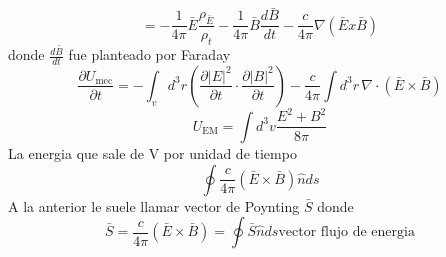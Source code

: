\documentclass{article}
\begin{document}
		\begin{equation*}
			= -\frac{1}{4\pi}\bar{E}\frac{\rho_{\bar{E}}}{\rho_{t}} -\frac{1}{4\pi}\bar{B}\frac{d\bar{B}}{dt}-\frac{c}{4\pi}\nabla(\bar{E}x\bar{B})
		\end{equation*}
		donde \(\frac{d\bar{B}}{dt}\) fue planteado por Faraday
		\begin{equation}
			\frac{\partial U_{\text{mec}}}{\partial t} = - \int_{v} d^3r \left( \frac{\partial |E|^2}{\partial t} \cdot \frac{\partial |B|^2}{\partial t} \right) - \frac{c}{4\pi} \int d^3r \, \nabla \cdot \left( \bar{E} \times \bar{B} \right)			
		\end{equation}
		\begin{equation*}
			U_{\text{EM}}= \int d^3v \frac{E^2 +B^2}{8\pi}
		\end{equation*}		
		La energia que sale de V por unidad de tiempo
		\begin{equation*}
			\oint \frac{c}{4\pi}(\bar{E}\times\bar{B})\hat{n}ds
		\end{equation*}		
		A la anterior le suele llamar vector de Poynting \(\bar{S}\)
		donde
		\begin{equation}
			\bar{S}=\frac{c}{4\pi}(\bar{E}\times\bar{B})= \oint \bar{S}\hat{n}ds \text{vector flujo de energia}
		\end{equation}	
\end{document}
